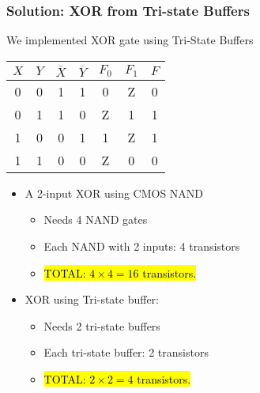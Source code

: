 \ifnum{}
\begin{frame}\frametitle{Solution: XOR from Tri-state Buffers}

We implemented XOR gate using Tri-State Buffers
\begin{table}[H]
\begin{center}
    \begin{tabular}{cc| cc| cc| c }
 $X$ & $Y$ & $\overline{X}$ & $\overline{Y}$ & $F_0$ & $F_1$ &  $F$ \\ \hline
  0 & 0 & 1 & 1 & 0     & Z & 0  \\ \hline
  0 & 1 & 1 & 0 & Z  &  1   & 1 \\ \hline
  1 & 0 & 0 & 1 & 1     & Z & 1 \\ \hline
  1 & 1 & 0 & 0 & Z  &  0   &  0\\ \hline
\end{tabular}
\end{center}
\end{table} 
\begin{itemize}
\item A 2-input XOR using CMOS NAND
\begin{itemize}
\item Needs 4 NAND gates
\item Each NAND with 2 inputs: 4 transistors
\item \hl{TOTAL: $4\times 4 = 16$ transistors.}
\end{itemize}

\item XOR using Tri-state buffer:
\begin{itemize}

\item Needs 2 tri-state buffers
\item Each tri-state buffer: 2 transistors
\item \hl{TOTAL: $2\times 2 = 4$ transistors.}
\end{itemize}
\end{itemize}

\end{frame}
\fi



